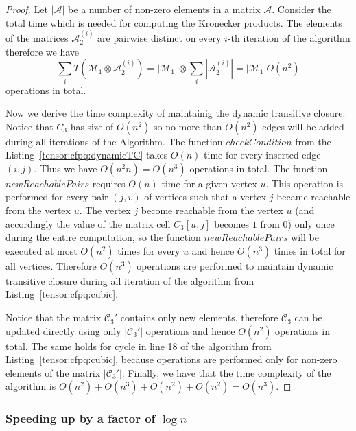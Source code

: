\begin{proof}
 Let $|\mathcal{A}|$ be a number of non-zero elements in a matrix $\mathcal{A}$. Consider the total time which is needed for computing the Kronecker products. The elements of the matrices $\mathcal{A}_2^{(i)}$ are pairwise distinct on every $i$-th iteration of the algorithm therefore we have 
 $$\sum\limits_i{T(\mathcal{M}_1 \otimes \mathcal{A}_2^{(i)})} = |\mathcal{M}_1| \otimes \sum\limits_i {|\mathcal{A}_2^{(i)}|} = |\mathcal{M}_1|O(n^2)$$
 operations in total. 


Now we derive the time complexity of maintainig the dynamic transitive closure. Notice that $C_3$ has size of $O(n^2)$ so no more than $O(n^2)$ edges will be added during all iterations of the Algorithm. The function $checkCondition$ from the Listing~\ref{tensor:cfpq:dynamicTC} takes $O(n)$ time for every inserted edge $(i, j)$. Thus we have $O(n^2n) = O(n^3)$ operations in total. The function $newReachablePairs$ requires $O(n)$ time for a given vertex $u$. This operation is performed for every pair $(j, v)$ of vertices such that a vertex $j$ became reachable from the vertex $u$. The vertex $j$ become reachable from the vertex $u$ (and accordingly the value of the matrix cell $C_3[u, j]$ becomes $1$ from $0$) only once during the entire computation, so the function $newReachablePairs$ will be executed at most $O(n^2)$ times for every $u$ and hence $O(n^3)$ times in total for all vertices. Therefore $O(n^3)$ operations are performed to maintain dynamic transitive closure during all iteration of the algorithm from Listing~\ref{tensor:cfpq:cubic}.


Notice that the matrix $\mathcal{C}_3'$ contains only new elements, therefore $\mathcal{C}_3$ can be updated directly using only $|\mathcal{C}_3'|$ operations and hence $O(n^2)$ operations in total. The same holds for cycle in line 18 of the algorithm from Listing~\ref{tensor:cfpq:cubic}, because operations are performed only for non-zero elements of the matrix $|\mathcal{C}_3'|$. Finally, we have that the time complexity of the algorithm is $O(n^2) + O(n^3) + O(n^2) + O(n^2) = O(n^3)$.
\end{proof}{}

\subsubsection{Speeding up by a factor of $\log n$}

